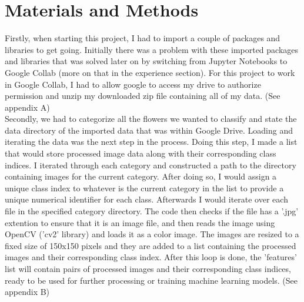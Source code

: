 \documentclass[paper=a4, fontsize=11pt,twoside]{scrartcl}
\begin{document}
\section{Materials and Methods}


Firstly, when starting this project, I had to import a couple of packages and libraries to get going. Initially there was a problem with these imported packages and libraries that was solved later on by switching from Jupyter Notebooks to Google Collab (more on that in the experience section). For this project to work in Google Collab, I had to allow google to access my drive to authorize permission and unzip my downloaded zip file containing all of my data. (See appendix A) \\

Secondly, we had to categorize all the flowers we wanted to classify and state the data directory of the imported data that was within Google Drive. Loading and iterating the data was the next step in the process. Doing this step, I made a list that would store processed image data along with their corresponding class indices. I iterated through each category and constructed a path to the directory containing images for the current category. After doing so, I would assign a unique class index to whatever is the current category in the list to provide a unique numerical identifier for each class. Afterwards I would iterate over each file in the specified category directory. The code then checks if the file has a '.jpg' extention to ensure that it is an image file, and then reads the image using OpenCV ('cv2' library) and loads it as a color image. The images are resized to a fixed size of 150x150 pixels and they are added to a list containing the processed images and their corresponding class index. After this loop is done, the 'features' list will contain pairs of processed images and their corresponding class indices, ready to be used for further processing or training machine learning models. (See appendix B) \\
\end{document}
